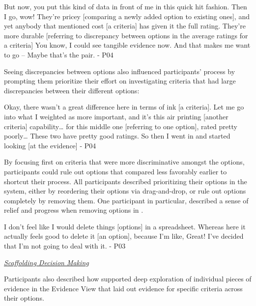 \begin{tightquote}

But now, you put this kind of data in front of me in this quick hit fashion. Then I go, wow! They're pricey [comparing a newly added option to existing ones], and yet anybody that mentioned cost [a criteria] has given it the full rating. They're more durable [referring to discrepancy between options in the average ratings for a criteria] You know, I could see tangible evidence now. And that makes me want to go -- Maybe that's the pair.  - P04

\end{tightquote}

Seeing discrepancies between options also influenced participants’ process by prompting them prioritize their effort on investigating criteria that had large discrepancies between their different options:

\begin{tightquote}

Okay, there wasn't a great difference here in terms of ink [a criteria]. Let me go into what I weighted as more important, and it's this air printing [another criteria] capability… for this middle one [referring to one option], rated pretty poorly… These two have pretty good ratings. So then I went in and started looking [at the evidence] - P04

\end{tightquote}

By focusing first on criteria that were more discriminative amongst the options, participants could rule out options that compared less favorably earlier to shortcut their process. All participants described prioritizing their options in the system, either by reordering their options via drag-and-drop, or rule out options completely by removing them. One participant in particular, described a sense of relief and progress when removing options in \SYSTEM. 

\begin{tightquote}

I don't feel like I would delete things [options] in a spreadsheet. Whereas here it actually feels good to delete it [an option], because I'm like, Great! I've decided that I'm not going to deal with it.  - P03

\end{tightquote}

\emph{\underline{Scaffolding Decision Making}}

Participants also described how \SYSTEM supported deep exploration of individual pieces of evidence in the Evidence View that laid out evidence for specific criteria across their options.

